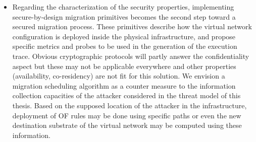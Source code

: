 \begin{itemize}
    \item 
    Regarding the characterization of the security properties, implementing secure-by-design migration primitives becomes the second step toward a secured migration process. These primitives describe how the virtual network configuration is deployed inside the physical infrastructure, and propose specific metrics and probes to be used in the generation of the execution trace. Obvious cryptographic protocols will partly answer the confidentiality aspect but these may not be applicable everywhere and other properties (\eg availability, co-residency) are not fit for this solution. We envision a migration scheduling algorithm as a counter measure to the information collection capacities of the attacker considered in the threat model of this thesis. Based on the supposed location of the attacker in the infrastructure, deployment of OF rules may be done using specific paths or even the new destination substrate of the virtual network may be computed using these information. 
    
\end{itemize}


